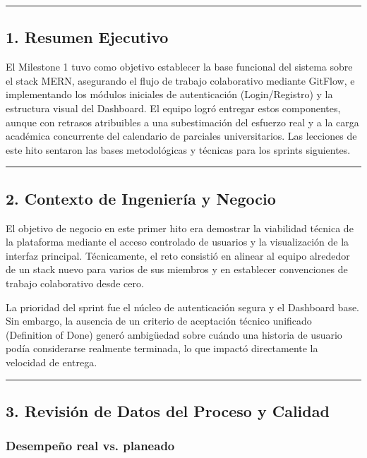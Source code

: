 \documentclass[11pt,a4paper]{article}
\begin{document}
\vspace{0.6em}\hrule\vspace{0.8em}

\subsection{1. Resumen Ejecutivo}

El Milestone 1 tuvo como objetivo establecer la base funcional del sistema sobre el stack MERN, asegurando el flujo de trabajo colaborativo mediante GitFlow, e implementando los módulos iniciales de autenticación (Login/Registro) y la estructura visual del Dashboard. El equipo logró entregar estos componentes, aunque con retrasos atribuibles a una subestimación del esfuerzo real y a la carga académica concurrente del calendario de parciales universitarios. Las lecciones de este hito sentaron las bases metodológicas y técnicas para los sprints siguientes.

\vspace{0.6em}\hrule\vspace{0.8em}

\subsection{2. Contexto de Ingeniería y Negocio}

El objetivo de negocio en este primer hito era demostrar la viabilidad técnica de la plataforma mediante el acceso controlado de usuarios y la visualización de la interfaz principal. Técnicamente, el reto consistió en alinear al equipo alrededor de un stack nuevo para varios de sus miembros y en establecer convenciones de trabajo colaborativo desde cero.

La prioridad del sprint fue el núcleo de autenticación segura y el Dashboard base. Sin embargo, la ausencia de un criterio de aceptación técnico unificado (Definition of Done) generó ambigüedad sobre cuándo una historia de usuario podía considerarse realmente terminada, lo que impactó directamente la velocidad de entrega.

\vspace{0.6em}\hrule\vspace{0.8em}

\subsection{3. Revisión de Datos del Proceso y Calidad}

\subsubsection{Desempeño real vs. planeado}
\end{document}
